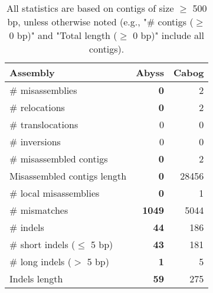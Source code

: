 \documentclass[12pt,a4paper]{article}
\begin{document}
\begin{table}[ht]
\begin{center}
\caption{All statistics are based on contigs of size $\geq$ 500 bp, unless otherwise noted (e.g., "\# contigs ($\geq$ 0 bp)" and "Total length ($\geq$ 0 bp)" include all contigs).}
\begin{tabular}{|l*{2}{|r}|}
\hline
Assembly & Abyss & Cabog \\ \hline
\# misassemblies & {\bf 0} & 2 \\ \hline
\hspace{5mm}\# relocations & {\bf 0} & 2 \\ \hline
\hspace{5mm}\# translocations & 0 & 0 \\ \hline
\hspace{5mm}\# inversions & 0 & 0 \\ \hline
\# misassembled contigs & {\bf 0} & 2 \\ \hline
Misassembled contigs length & {\bf 0} & 28456 \\ \hline
\# local misassemblies & {\bf 0} & 1 \\ \hline
\# mismatches & {\bf 1049} & 5044 \\ \hline
\# indels & {\bf 44} & 186 \\ \hline
\hspace{5mm}\# short indels ($\leq$ 5 bp) & {\bf 43} & 181 \\ \hline
\hspace{5mm}\# long indels ($>$ 5 bp) & {\bf 1} & 5 \\ \hline
Indels length & {\bf 59} & 275 \\ \hline
\end{tabular}
\end{center}
\end{table}
\end{document}
